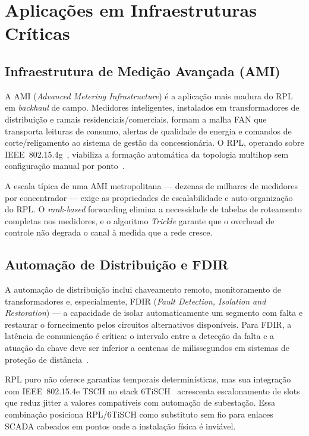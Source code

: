 \documentclass[conference]{IEEEtran}
\begin{document}
\section{Aplicações em Infraestruturas Críticas}
\label{sec:apps}

\subsection{Infraestrutura de Medição Avançada (AMI)}

A AMI (\textit{Advanced Metering Infrastructure}) é a aplicação mais madura do
RPL em \textit{backhaul} de campo. Medidores inteligentes, instalados em transformadores
de distribuição e ramais residenciais/comerciais, formam a malha FAN que
transporta leituras de consumo, alertas de qualidade de energia e comandos de
corte/religamento ao sistema de gestão da concessionária. O RPL, operando sobre
IEEE~802.15.4g~\cite{ieee802154g}, viabiliza a formação automática da topologia
multihop sem configuração manual por ponto~\cite{ancillotti2013rpl}.

A escala típica de uma AMI metropolitana --- dezenas de milhares de medidores
por concentrador --- exige as propriedades de escalabilidade e auto-organização
do RPL. O \textit{rank-based} forwarding elimina a necessidade de tabelas de
roteamento completas nos medidores, e o algoritmo \textit{Trickle} garante que o overhead
de controle não degrada o canal à medida que a rede cresce.

\subsection{Automação de Distribuição e FDIR}

A automação de distribuição inclui chaveamento remoto, monitoramento de
transformadores e, especialmente, FDIR (\textit{Fault Detection, Isolation and
Restoration}) --- a capacidade de isolar automaticamente um segmento com falta
e restaurar o fornecimento pelos circuitos alternativos disponíveis. Para FDIR,
a latência de comunicação é crítica: o intervalo entre a detecção da falta e a
atuação da chave deve ser inferior a centenas de milissegundos em sistemas de
proteção de distância~\cite{gungor2011smartgrid}.

RPL puro não oferece garantias temporais determinísticas, mas sua integração com
IEEE~802.15.4e TSCH no stack 6TiSCH~\cite{de2014orchestra} acrescenta
escalonamento de slots que reduz jitter a valores compatíveis com automação de
subestação. Essa combinação posiciona RPL/6TiSCH como substituto sem fio para
enlaces SCADA cabeados em pontos onde a instalação física é inviável.
\end{document}
